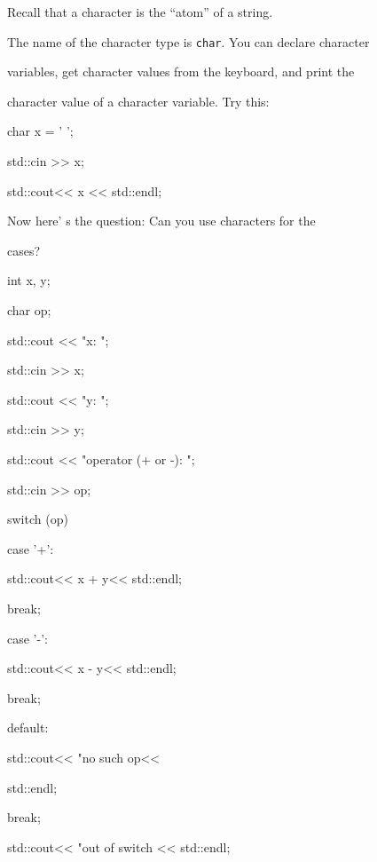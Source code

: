 Recall that a character is the ``atom'' of a string.

The name of the character type is \texttt{char}. You can declare character

variables, get character values from the keyboard, and print the

character value of a character variable. Try this:

\begin{console}

char x = ' ';

std::cin >> x;

std::cout<< x << std::endl;

\end{console}

Now here' s the question: Can you use characters for the

cases?

\begin{console}

int x, y;

char op;

std::cout << "x: ";

std::cin >> x;

std::cout << "y: ";

std::cin >> y;

std::cout << "operator (+ or -): ";

std::cin >> op;

switch (op)

{

        case '+':

             std::cout<< x + y<< std::endl;

             break;

             

        case '-':

             std::cout<< x - y<< std::endl;

             break;

        

        default:

             std::cout<< "no such op<<

             std::endl;

             break;

}

std::cout<< "out of switch << std::endl; 

\end{console}

